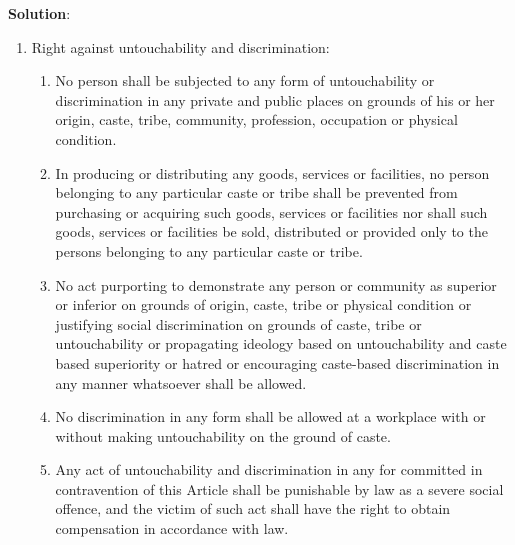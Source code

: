 \documentclass[
  openany]{book}
\newenvironment{solution}{ {\bfseries Solution}:}{}
\begin{document}
\begin{questions}
\begin{solution}
\begin{enumerate}
\item Right against untouchability and discrimination:
\begin{enumerate}
\item No person shall be subjected to any form of untouchability or discrimination in any private and public places on grounds of his or her origin, caste, tribe, community, profession, occupation or physical condition.
\item In producing or distributing any goods, services or facilities, no person belonging to any particular caste or tribe shall be prevented from purchasing or acquiring such goods, services or facilities nor shall such goods, services or facilities be sold, distributed or provided only to the persons belonging to any particular caste or tribe.
\item No act purporting to demonstrate any person or community as superior or inferior on grounds of origin, caste, tribe or physical condition or justifying social discrimination on grounds of caste, tribe or untouchability or propagating ideology based on untouchability and caste based superiority or hatred or encouraging caste-based discrimination in any manner whatsoever shall be allowed.
\item No discrimination in any form shall be allowed at a workplace with or without making untouchability on the ground of caste.
\item Any act of untouchability and discrimination in any for committed in contravention of this Article shall be punishable by law as a severe social offence, and the victim of such act shall have the right to obtain compensation in accordance with law.
\end{enumerate}


\end{enumerate}
\end{solution}
\end{questions}
\end{document}
